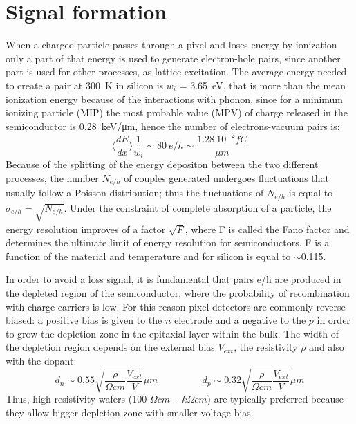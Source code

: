 \section{Signal formation}
   When a charged particle passes through a pixel and loses energy by ionization only a part of that energy is used to generate electron-hole pairs, since another part is used for other processes, as lattice excitation.
   The average energy needed to create a pair at \SI{300}{K} in silicon is $w_i$ = \SI{3.65}{eV}, that is more than the mean ionization energy because of the interactions with phonon, since for a minimum ionizing particle (MIP) the most probable value (MPV) of charge released in the semiconductor is \SI{0.28}{keV/\um}, hence the number of electrons-vacuum pairs is: 
   \begin{equation}
       \langle \frac{dE}{dx}\rangle \frac{1}{w_i} \sim 80 \: e/h \sim \frac{1.28 \:10^{-2}fC}{\mu m}
   \end{equation}
   Because of the splitting of the energy depositon between the two different processes, the number $N_{e/h}$ of couples generated undergoes fluctuations that usually follow a Poisson distribution;
   thus the fluctuations of $N_{e/h}$ is equal to  $\sigma_{e/h} =\sqrt{N_{e/h}}$.
   Under the constraint of complete absorption of a particle, the energy resolution improves of a factor $\sqrt{F}$, where F is called the Fano factor and determines the ultimate limit of energy resolution for semiconductors. F is a function of the material and temperature and for silicon is equal to $\sim$0.115.

   In order to avoid a loss signal, it is fundamental that pairs e/h are produced in the depleted region of the semiconductor, where the probability of recombination with charge carriers is low.
   For this reason pixel detectors are commonly reverse biased: a positive bias is given to the $n$ electrode and a negative to the $p$ in order to grow the depletion zone in the epitaxial layer within the bulk. 
   The width of the depletion region depends on the external bias $V_{ext}$, the resistivity $\rho$ and also with the dopant:
   \begin{equation}
      d_{n} \sim 0.55 \sqrt{\frac{\rho}{\Omega cm}\frac{V_{ext}}{V}} \mu m 
      \hspace{55pt}
      d_{p} \sim 0.32 \sqrt{\frac{\rho}{\Omega cm}\frac{V_{ext}}{V}} \mu m
      \label{eq:deplation_d}
   \end{equation}
   Thus, high resistivity wafers (100 $\Omega cm - k\Omega cm$) are typically preferred because they allow bigger depletion zone with smaller voltage bias. 

